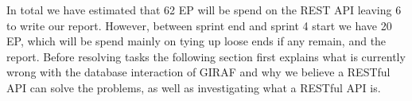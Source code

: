 In total we have estimated that 62 EP will be spend on the REST API leaving 6 to write our report.
However, between sprint end and sprint 4 start we have 20 EP, which will be spend mainly on tying up loose ends if any remain, and the report.
Before resolving tasks the following section first explains what is currently wrong with the database interaction of GIRAF and why we believe a RESTful API can solve the problems, as well as investigating what a RESTful API is.
